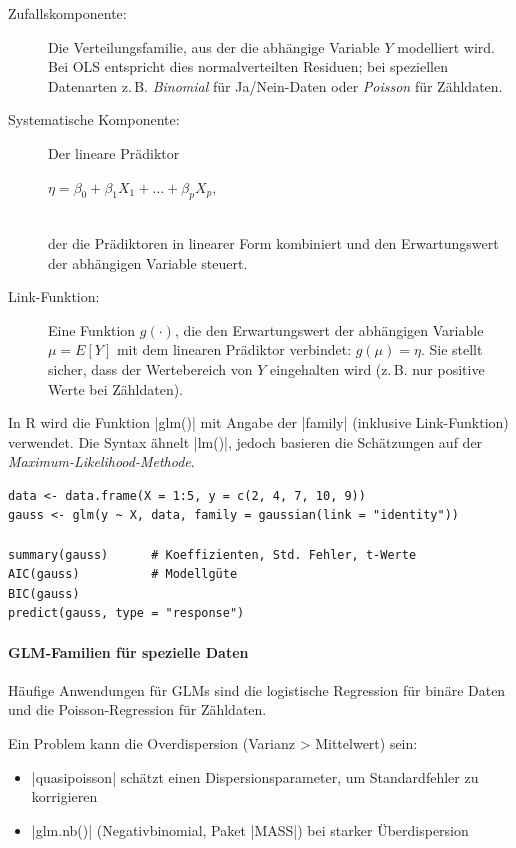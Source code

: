 \documentclass[10pt,twocolumn]{scrartcl}
\renewcommand{\lstinline}{\mycoloredinline}
\begin{document}
\begin{description}
\item[Zufallskomponente:] Die Verteilungsfamilie, aus der die abhängige Variable $Y$ modelliert wird.  
Bei OLS entspricht dies normalverteilten Residuen; bei speziellen Datenarten z.\,B. \emph{Binomial} für Ja/Nein-Daten oder \emph{Poisson} für Zähldaten.
\item[Systematische Komponente:] Der lineare Prädiktor\\
\centerline{$ \eta = \beta_0 + \beta_1 X_1 + \dots + \beta_p X_p, $} \\
der die Prädiktoren in linearer Form kombiniert und den Erwartungswert der abhängigen Variable steuert.
\item[Link-Funktion:] Eine Funktion $g(\cdot)$, die den Erwartungswert der abhängigen Variable $\mu = E[Y]$ mit dem linearen Prädiktor verbindet: $g(\mu) = \eta$. Sie stellt sicher, dass der Wertebereich von $Y$ eingehalten wird (z.\,B. nur positive Werte bei Zähldaten).
\end{description}

In R wird die Funktion \lstinline|glm()| mit Angabe der \lstinline|family| (inklusive Link-Funktion) verwendet. Die Syntax ähnelt \lstinline|lm()|, jedoch basieren die Schätzungen auf der \emph{Maximum-Likelihood-Methode}.

\begin{lstlisting}
data <- data.frame(X = 1:5, y = c(2, 4, 7, 10, 9))
gauss <- glm(y ~ X, data, family = gaussian(link = "identity"))

summary(gauss)      # Koeffizienten, Std. Fehler, t-Werte
AIC(gauss)          # Modellgüte
BIC(gauss)
predict(gauss, type = "response")
\end{lstlisting}

\paragraph{GLM-Familien für spezielle Daten}

Häufige Anwendungen für GLMs sind die logistische Regression für binäre Daten und die Poisson-Regression für Zähldaten.

Ein Problem kann die Overdispersion (Varianz > Mittelwert) sein:
\begin{itemize}
\item \lstinline|quasipoisson| schätzt einen Dispersionsparameter, um Standardfehler zu korrigieren  
\item \lstinline|glm.nb()| (Negativbinomial, Paket \lstinline|MASS|) bei starker Überdispersion  
\end{itemize}
\end{document}
